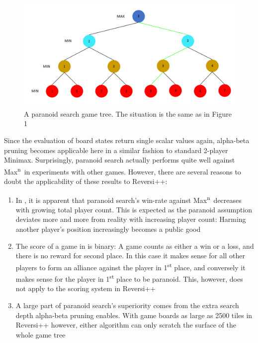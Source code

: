 \documentclass[a4paper,12pt]{article}
\newcommand{\Maxn}{Max\textsuperscript{n}\ }
\begin{document}
\begin{figure}[H]
    \centering
    \includegraphics[width=\textwidth,keepaspectratio]{pictures/assignment3/ParanoidSearchTree.png}
    \caption{A paranoid search game tree. The situation is the same as in Figure 1}
\end{figure}

Since the evaluation of board states return single scalar values again, alpha-beta pruning becomes applicable here in a similar fashion to standard 2-player Minimax. Surprisingly, paranoid search actually performs quite well against \Maxn in experiments \cite{algorithm-comparison}\cite{best-reply-search} with other games. However, there are several reasons to doubt the applicability of these results to Reversi++:
\begin{enumerate}
\item In \cite{algorithm-comparison}, it is apparent that paranoid search's win-rate against \Maxn decreases with growing total player count. This is expected as the paranoid assumption deviates more and more from reality with increasing player count: Harming another player's position increasingly becomes a public good
\item The score of a game in \cite{best-reply-search} is binary: A game counts as either a win or a loss, and there is no reward for second place. In this case it makes sense for all other players to form an alliance against the player in 1\textsuperscript{st} place, and conversely it makes sense for the player in 1\textsuperscript{st} place to be paranoid. This, however, does not apply to the scoring system in Reversi++
\item A large part of paranoid search's superiority comes from the extra search depth alpha-beta pruning enables. With game boards as large as 2500 tiles in Reversi++ however, either algorithm can only scratch the surface of the whole game tree
\end{enumerate}
\end{document}
